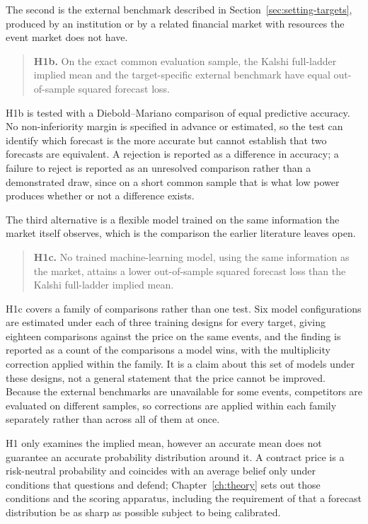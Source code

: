 \documentclass[12pt,a4paper]{report}
\begin{document}
The second is the external benchmark described in
Section~\ref{sec:setting-targets}, produced by an institution or by a related
financial market with resources the event market does not have.

\begin{quote}
\textbf{H1b.} On the exact common evaluation sample, the Kalshi full-ladder
implied mean and the target-specific external benchmark have equal
out-of-sample squared forecast loss.
\end{quote}

H1b is tested with a Diebold--Mariano comparison of equal predictive accuracy.
No non-inferiority margin is specified in advance or estimated, so the test
can identify which forecast is the more accurate but cannot establish that two
forecasts are equivalent. A rejection is reported as a difference in accuracy;
a failure to reject is reported as an unresolved comparison rather than a
demonstrated draw, since on a short common sample that is what low power
produces whether or not a difference exists.

The third alternative is a flexible model trained on the same information the
market itself observes, which is the comparison the earlier literature leaves
open.

\begin{quote}
\textbf{H1c.} No trained machine-learning model, using the same information as
the market, attains a lower out-of-sample squared forecast loss than the
Kalshi full-ladder implied mean.
\end{quote}

H1c covers a family of comparisons rather than one test. Six model
configurations are estimated under each of three training designs for every
target, giving eighteen comparisons against the price on the same events, and
the finding is reported as a count of the comparisons a model wins, with the
multiplicity correction applied within the family. It is a claim about this
set of models under these designs, not a general statement that the price
cannot be improved. Because the external benchmarks are unavailable for some
events, competitors are evaluated on different samples, so corrections are
applied within each family separately rather than across all of them at once.

H1 only examines the implied mean, however an accurate mean does not guarantee an accurate probability distribution around it. A contract price is a risk-neutral probability and coincides with an
average belief only under conditions that \textcite{manski2006} questions and
\textcite{wolfers2006} defend; Chapter~\ref{ch:theory} sets out those
conditions and the scoring apparatus, including the requirement of
\textcite{gneiting2007} that a forecast distribution be as sharp as possible
subject to being calibrated.
\end{document}
